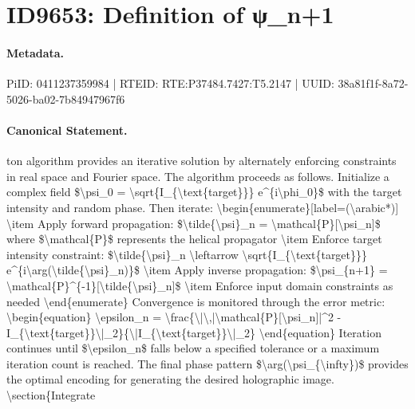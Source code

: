 \section*{ID9653: Definition of ψ\_n+1}
\paragraph{Metadata.}
PiID: 0411237359984 | RTEID: RTE:P37484.7427:T5.2147 | UUID: 38a81f1f-8a72-5026-ba02-7b84947967f6

\paragraph{Canonical Statement.}
ton algorithm provides an iterative solution by alternately enforcing constraints in real space and Fourier space. The algorithm proceeds as follows. Initialize a complex field \$\textbackslash{}psi\_0 = \textbackslash{}sqrt\{I\_\{\textbackslash{}text\{target\}\}\} e\textasciicircum{}\{i\textbackslash{}phi\_0\}\$ with the target intensity and random phase. Then iterate: \textbackslash{}begin\{enumerate\}[label=(\textbackslash{}arabic*)] \textbackslash{}item Apply forward propagation: \$\textbackslash{}tilde\{\textbackslash{}psi\}\_n = \textbackslash{}mathcal\{P\}[\textbackslash{}psi\_n]\$ where \$\textbackslash{}mathcal\{P\}\$ represents the helical propagator \textbackslash{}item Enforce target intensity constraint: \$\textbackslash{}tilde\{\textbackslash{}psi\}\_n \textbackslash{}leftarrow \textbackslash{}sqrt\{I\_\{\textbackslash{}text\{target\}\}\} e\textasciicircum{}\{i\textbackslash{}arg(\textbackslash{}tilde\{\textbackslash{}psi\}\_n)\}\$ \textbackslash{}item Apply inverse propagation: \$\textbackslash{}psi\_\{n+1\} = \textbackslash{}mathcal\{P\}\textasciicircum{}\{-1\}[\textbackslash{}tilde\{\textbackslash{}psi\}\_n]\$ \textbackslash{}item Enforce input domain constraints as needed \textbackslash{}end\{enumerate\} Convergence is monitored through the error metric: \textbackslash{}begin\{equation\} \textbackslash{}epsilon\_n = \textbackslash{}frac\{\textbackslash{}|\textbackslash{},|\textbackslash{}mathcal\{P\}[\textbackslash{}psi\_n]|\textasciicircum{}2 - I\_\{\textbackslash{}text\{target\}\}\textbackslash{}|\_2\}\{\textbackslash{}|I\_\{\textbackslash{}text\{target\}\}\textbackslash{}|\_2\} \textbackslash{}end\{equation\} Iteration continues until \$\textbackslash{}epsilon\_n\$ falls below a specified tolerance or a maximum iteration count is reached. The final phase pattern \$\textbackslash{}arg(\textbackslash{}psi\_\{\textbackslash{}infty\})\$ provides the optimal encoding for generating the desired holographic image. \textbackslash{}section\{Integrate

